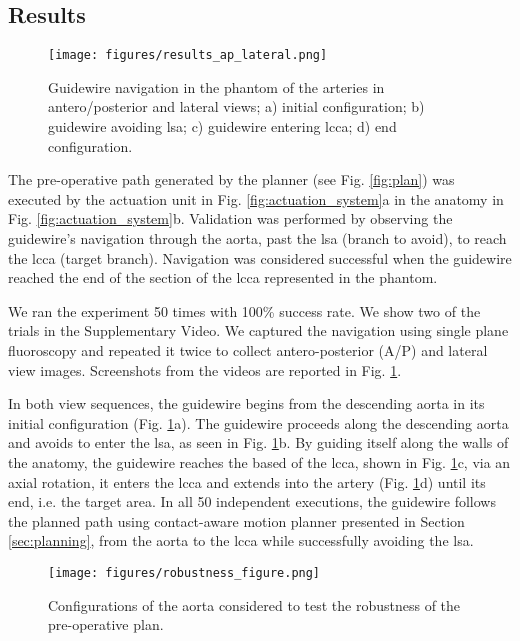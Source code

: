 \subsection{Results}
\begin{figure}[t] 
    \texttt{[image: figures/results\_ap\_lateral.png]}
    \caption{Guidewire navigation in the phantom of the arteries in antero/posterior and lateral views; a) initial configuration; b) guidewire avoiding \gls{lsa}; c) guidewire entering \gls{lcca}; d) end configuration.}
    \label{fig:results}
\end{figure}
The pre-operative path generated by the planner (see Fig. \ref{fig:plan}) was executed by the actuation unit in Fig. \ref{fig:actuation_system}a in the anatomy in Fig. \ref{fig:actuation_system}b. Validation was performed by observing the guidewire's navigation through the aorta, past the \gls{lsa} (branch to avoid), to reach the \gls{lcca} (target branch). Navigation was considered successful when the guidewire reached the end of the section of the \gls{lcca} represented in the phantom.

We ran the experiment 50 times with 100\% success rate. We show two of the trials in the Supplementary Video. We captured the navigation using single plane fluoroscopy and repeated it twice to collect antero-posterior (A/P) and lateral view images. Screenshots from the videos are reported in Fig. \ref{fig:results}.

In both view sequences, the guidewire begins from the descending aorta in its initial configuration (Fig. \ref{fig:results}a). The guidewire proceeds along the descending aorta and avoids to enter the \gls{lsa}, as seen in Fig. \ref{fig:results}b. By guiding itself along the walls of the anatomy, the guidewire reaches the based of the \gls{lcca}, shown in Fig. \ref{fig:results}c, via an axial rotation, it enters the \gls{lcca} and extends into the artery (Fig. \ref{fig:results}d) until its end, i.e. the target area. In all 50 independent executions, the guidewire follows the planned path using contact-aware motion planner presented in Section \ref{sec:planning}, from the aorta to the \gls{lcca} while successfully avoiding the \gls{lsa}.

\begin{figure}[t] 
    \centering
    \texttt{[image: figures/robustness\_figure.png]}
    \caption{Configurations of the aorta considered to test the robustness of the pre-operative plan.}
    \label{fig:robustness}
\end{figure}

